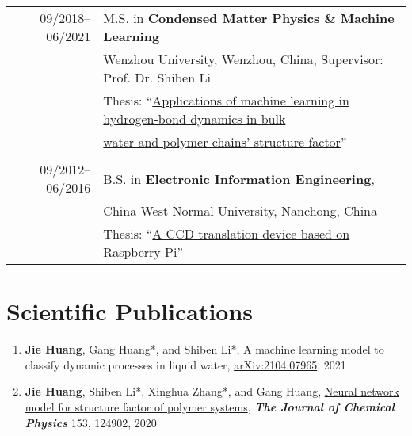 \documentclass[a4paper,10pt]{article} %
\begin{document}
\begin{tabular}{r|l}	
09/2018--06/2021 				    & M.S. in \textbf{Condensed Matter Physics \& Machine Learning}\\
                                    & Wenzhou University, Wenzhou, China, Supervisor: Prof. Dr. Shiben Li\\
                                    & Thesis: “\href{https://nbviewer.jupyter.org/github/HuangJiaLian/DataBase0/blob/master/uPic/2021_07_24_12_HuangJieBiYeDaBian.pdf}{Applications of machine learning in hydrogen-bond dynamics in bulk} \\& \href{https://nbviewer.jupyter.org/github/HuangJiaLian/DataBase0/blob/master/uPic/2021_07_24_12_HuangJieBiYeDaBian.pdf}{water and polymer chains’ structure factor}”\\

\multicolumn{2}{c}{} \\	%

09/2012--06/2016                    & B.S. in \textbf{Electronic Information Engineering}, \\                    & China West Normal University, Nanchong, China\\
					 & Thesis: “\href{https://nbviewer.jupyter.org/github/HuangJiaLian/DataBase0/blob/master/uPic/2021_07_24_13_CCD_translation_device.pdf}{A CCD translation device based on Raspberry Pi}”		
\end{tabular}

%	
%
\section{Scientific Publications}  

\begin{small}
\begin{enumerate}
\item \textbf{Jie Huang}, Gang Huang*, and Shiben Li*, A machine learning model to classify dynamic processes in liquid water,   \href{https://arxiv.org/abs/2104.07965}{arXiv:2104.07965}, 2021

\item \textbf{Jie Huang}, Shiben Li*, Xinghua Zhang*, and Gang Huang, \href{https://aip.scitation.org/doi/10.1063/5.0022464}{Neural network model for structure factor of polymer systems},  \textbf{\emph{The Journal of Chemical Physics}} 153, 124902, 2020
\end{enumerate}
\end{small}
\end{document}

